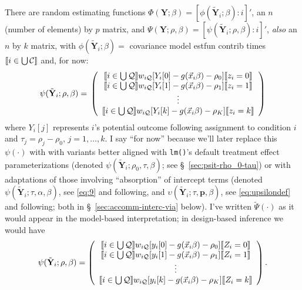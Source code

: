 \documentclass{article}
\DeclarePairedDelimiter{\indicator}{\llbracket}{\rrbracket}
\begin{document}
There are random estimating functions $\Phi(\mathbf{Y}; \beta ) =
[\phi(\tilde{\mathbf{Y}}_{i};
\beta) : i]'$, an $n$ (number of elements) by $p$ matrix,  and 
       $\Psi(\mathbf{Y}; \rho, \beta) = [\psi(\tilde{\mathbf{Y}}_{i};
       \rho, \beta): i]'$, \textit{also} an $n$ by $k$ matrix, with 
       $\phi(\tilde{\mathbf{Y}}_{i}; \beta)=$ covariance model estfun
       contrib times $\indicator{i \in \bigcup \mathcal{C}}$ and, for now:
\begin{equation}
         \label{eq:5}
         \psi(\tilde{\mathbf{Y}}_{i}; \rho, \beta) =\\
         \left( \begin{array}{c}
           \indicator{i \in \bigcup \mathcal{Q}}w_{i\mathcal{Q}}[Y_{i}[0] - g(\vec{x}_{i}\beta)-
                  \rho_{0}]\indicator{z_{i}=0}\\
           \indicator{i \in \bigcup \mathcal{Q}}w_{i\mathcal{Q}}[Y_{i}[1] - g(\vec{x}_{i}\beta)-
                  \rho_{1}]\indicator{z_{i}=1}\\
                  \vdots \\
           \indicator{i \in \bigcup \mathcal{Q}}w_{i\mathcal{Q}}[Y_{i}[k] - g(\vec{x}_{i}\beta)-
                  \rho_{K}]\indicator{z_{i}=k}\\                  
                \end{array}\right)
\end{equation}
where $Y_{i}[j]$ represents $i$'s potential outcome following
assignment to condition $i$ and $\tau_{j} = \rho_{j}-\rho_{0}$, $j=1,
\ldots, k$. I say ``for now'' because we'll later replace this $\psi(\cdot)$ with
with variants better aligned with \texttt{lm()}'s default treatment effect parameterizations (denoted $\psi(\tilde{\mathbf{Y}}_{i}; \rho_{0}, \tau, \beta)$; see \S~\ref{sec:psit-rho_0-tau})  or with adaptations of those involving ``absorption'' of intercept terms (denoted $\psi(\tilde{\mathbf{Y}}_{i}; \tau, \alpha, \beta)$, see \eqref{eq:9} and following, and $\upsilon(\tilde{\mathbf{Y}}_{i}; \tau, \mathbf{p}, \beta)$, see \eqref{eq:upsilondef} and following; both in \S~\ref{sec:accomm-interc-via} below).  I've written $\tilde{\Psi}(\cdot)$ as
it would appear in the model-based interpretation; in design-based
inference we would have
\begin{equation*}
           \psi(\tilde{\mathbf{Y}}_{i}; \rho, \beta) =
         \left( \begin{array}{c}
           \indicator{i \in \bigcup \mathcal{Q}}w_{i\mathcal{Q}}[y_{i}[0] - g(\vec{x}_{i}\beta)-
                  \rho_{0}]\indicator{Z_{i}=0}\\
           \indicator{i \in \bigcup \mathcal{Q}}w_{i\mathcal{Q}}[y_{i}[1] - g(\vec{x}_{i}\beta)-
                  \rho_{1}]\indicator{Z_{i}=1}\\
                  \vdots \\
           \indicator{i \in \bigcup \mathcal{Q}}w_{i\mathcal{Q}}[y_{i}[k] - g(\vec{x}_{i}\beta)-
                  \rho_{K}]\indicator{Z_{i}=k}\\                  
                \end{array}\right).
\end{equation*}
\end{document}
